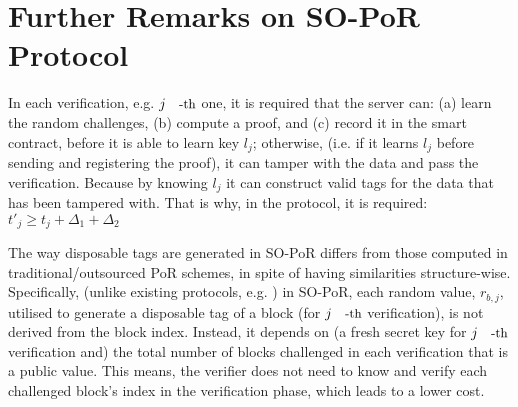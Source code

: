 
\section{Further Remarks on SO-PoR Protocol}\label{SO-PoR-discussion}





\begin{remark}
 In each verification, e.g. $j\text{\small{-th}}$ one, it is required that the server can: (a) learn the random challenges, (b) compute a proof, and (c) record it in the smart contract, before it is able to learn key $l_{\scriptscriptstyle j}$; otherwise, (i.e. if it learns $l_{\scriptscriptstyle j}$ before sending and registering the proof), it can tamper with the data and pass the verification. Because by knowing $l_{\scriptscriptstyle j}$ it can construct valid tags for the data that has been tampered with. That is why, in the protocol, it is required: $t'_{\scriptscriptstyle j}\geq t_{\scriptscriptstyle j}+\Delta_{\scriptscriptstyle 1}+\Delta_{\scriptscriptstyle 2}$
\end{remark}


\begin{remark}
The way disposable tags are generated in SO-PoR  differs from those computed  in traditional/outsourced PoR schemes, in spite of having similarities structure-wise. Specifically, (unlike existing protocols, e.g. \cite{DBLP:conf/asiacrypt/ShachamW08,armknecht2014outsourced}) in SO-PoR, each random value, $r_{\scriptscriptstyle b,j}$, utilised to generate  a disposable tag of a  block (for $j\text{\small{-th}}$ verification), is not derived from the block index. Instead, it depends on (a  fresh secret key for $j\text{\small{-th}}$ verification and) the total number of blocks challenged in each verification that is a public value. This means, the verifier does not need to know and verify each challenged block's index in the verification phase, which leads to a lower cost.  
\end{remark}

